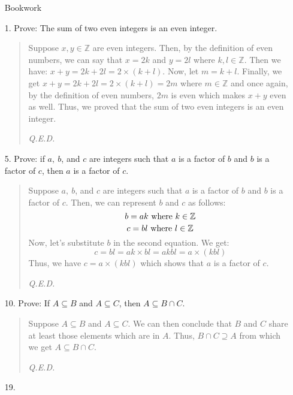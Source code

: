\documentclass[12pt, a4paper]{article}                      %
\begin{document}
\begin{enumerate}
\newpage
{\Large Bookwork}
\item[1.]
Prove: The sum of two even integers is an even integer.
\begin{quote}
Suppose $x, y \in \mathbb{Z}$ are even integers. Then, by the definition of even
numbers, we can say that $x = 2k$ and $y = 2l$ where $k, l \in \mathbb{Z}$.
Then we have: $x + y = 2k + 2l = 2 \times (k + l)$. Now, let $m = k + l$.
Finally, we get $x + y = 2k + 2l = 2 \times (k + l) = 2m$ where $m \in \mathbb{Z}$
and once again, by the definition of even numbers, $2m$ is even which makes $x + y$ even as well.
Thus, we proved that the sum of two even integers is an even integer.
\begin{flushright}
\textit{Q.E.D.}
\end{flushright}
\end{quote}

\item[5.]
Prove: if $a, \ b$, and $c$ are integers such that $a$ is a factor of $b$ and $b$ is a factor of $c$,
then $a$ is a factor of $c$.
\begin{quote}
Suppose $a, \ b$, and $c$ are integers such that $a$ is a factor of $b$ and $b$ is a factor of $c$.
Then, we can represent $b$ and $c$ as follows:
$$
b = ak \ \textnormal{where} \ k \in \mathbb{Z}
$$
$$
c = bl \ \textnormal{where} \ l \in \mathbb{Z}
$$
Now, let's substitute $b$ in the second equation. We get:
$$
c = bl = ak \times bl = akbl = a \times (kbl)
$$
Thus, we have $c = a \times (kbl)$ which shows that $a$ is a factor of $c$.
\begin{flushright}
\textit{Q.E.D.}
\end{flushright}
\end{quote}

\item[10.]
Prove: If $A \subseteq B$ and $A \subseteq C$, then $A \subseteq B \cap C$.
\begin{quote}
Suppose $A \subseteq B$ and $A \subseteq C$. We can then conclude that $B$ and $C$ share
at least those elements which are in $A$. Thus, $B \cap C \supseteq A$ from which we get
$A \subseteq B \cap C$.
\begin{flushright}
\textit{Q.E.D.}
\end{flushright}
\end{quote}

\item[19.]


\end{enumerate}
\end{document}

